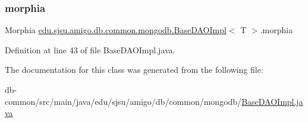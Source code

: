 \subsubsection{\texorpdfstring{morphia}{morphia}}
{\footnotesize\ttfamily Morphia \hyperlink{classedu_1_1sjsu_1_1amigo_1_1db_1_1common_1_1mongodb_1_1_base_d_a_o_impl}{edu.\+sjsu.\+amigo.\+db.\+common.\+mongodb.\+Base\+D\+A\+O\+Impl}$<$ T $>$.morphia\hspace{0.3cm}{\ttfamily [protected]}}



Definition at line 43 of file Base\+D\+A\+O\+Impl.\+java.



The documentation for this class was generated from the following file\+:\begin{DoxyCompactItemize}
\item 
db-\/common/src/main/java/edu/sjsu/amigo/db/common/mongodb/\hyperlink{_base_d_a_o_impl_8java}{Base\+D\+A\+O\+Impl.\+java}\end{DoxyCompactItemize}
